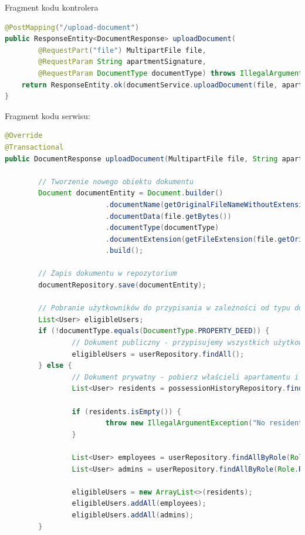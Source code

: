 Fragment kodu kontrolera
\begin{lstlisting}[language=Java, style=JavaStyle, caption=Fragment klasy \texttt{DocumentController}]
@PostMapping("/upload-document")
public ResponseEntity<DocumentResponse> uploadDocument(
        @RequestPart("file") MultipartFile file,
        @RequestParam String apartmentSignature,
        @RequestParam DocumentType documentType) throws IllegalArgumentException, IOException {
    return ResponseEntity.ok(documentService.uploadDocument(file, apartmentSignature, documentType));
}
\end{lstlisting}

Fragment kodu serwisu:
\begin{lstlisting}[language=Java, style=JavaStyle, caption=Metoda dodawania dokumentu w klasie \texttt{DocumentServiceImp}]
@Override
@Transactional
public DocumentResponse uploadDocument(MultipartFile file, String apartmentSignature, DocumentType documentType) throws IllegalArgumentException, IOException {

		// Tworzenie nowego obiektu dokumentu
		Document documentEntity = Document.builder()
						.documentName(getOriginalFileNameWithoutExtension(file.getOriginalFilename()))
						.documentData(file.getBytes())
						.documentType(documentType)
						.documentExtension(getFileExtension(file.getOriginalFilename()))
						.build();

		// Zapis dokumentu w repozytorium
		documentRepository.save(documentEntity);

		// Pobranie użytkowników do przypisania w zależności od typu dokumentu
		List<User> eligibleUsers;
		if (!documentType.equals(DocumentType.PROPERTY_DEED)) {
				// Dokument publiczny - przypisujemy wszystkich użytkowników
				eligibleUsers = userRepository.findAll();
		} else {
				// Dokument prywatny - pobierz właścieli apartamentu i pracowników oraz adminów
				List<User> residents = possessionHistoryRepository.findActiveResidentsByApartment(apartmentSignature);

				if (residents.isEmpty()) {
						throw new IllegalArgumentException("No residents found in apartment with signature: " + apartmentSignature);
				}

				List<User> employees = userRepository.findAllByRole(Role.ROLE_EMPLOYEE);
				List<User> admins = userRepository.findAllByRole(Role.ROLE_ADMIN);

				eligibleUsers = new ArrayList<>(residents);
				eligibleUsers.addAll(employees);
				eligibleUsers.addAll(admins);
		}


\end{lstlisting}

